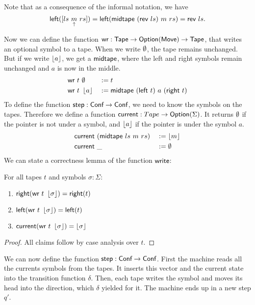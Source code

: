 Note that as a consequence of the informal notation, we have
$$\textsf{left}([ ls~\underset{\uparrow}{m}~rs ]) = \textsf{left}(\textsf{midtape}~(\textsf{rev}~ls)~{m}~{rs}) = \textsf{rev}~ls.$$

Now we can define the function $\textsf{wr} : \textsf{Tape} \rightarrow \textsf{Option}(\textsf{Move}) \rightarrow \textsf{Tape}$, that writes an optional symbol to a tape.  When we write $\emptyset$,
the tape remains unchanged.  But if we write $\left\lfloor {a}\right\rfloor$, we get a $\textsf{midtape}$, where the left and right symbols remain unchanged and $a$ is now in
the middle.
\begin{alignat*}{3}
  \textsf{wr}~t &~ \emptyset   &&:= t \\
  \textsf{wr}~t &~ \left\lfloor {a}\right\rfloor &&:= \textsf{midtape}~(\textsf{left}~t)~{a}~(\textsf{right}~t)
\end{alignat*}
To define the function $\textsf{step} : \textsf{Conf} \rightarrow \textsf{Conf}$, we need to know the symbols on the tapes.
Therefore we define a function $\textsf{current} : Tape \rightarrow \textsf{Option}(\Sigma)$.
It returns $\emptyset$ if the pointer is not under a symbol, and $\left\lfloor {a}\right\rfloor$ if the pointer is under the symbol $a$.
\begin{alignat*}{2}
  \textsf{current}&~(\textsf{midtape}~{ls}~{m}~{rs})&&:= \left\lfloor {m}\right\rfloor \\
  \textsf{current}&~\_                          &&:= \emptyset
\end{alignat*}
We can state a correctness lemma of the function $\textsf{write}$:
\begin{lemma}[Write]
  \label{lem:write}
  For all tapes $t$ and symbols $\sigma:\Sigma$:
  \begin{enumerate}
  \item $\textsf{right}   (\textsf{wr}~t~\left\lfloor {\sigma}\right\rfloor) = \textsf{right}(t)$
  \item $\textsf{left}    (\textsf{wr}~t~\left\lfloor {\sigma}\right\rfloor) = \textsf{left} (t)$
  \item $\textsf{current} (\textsf{wr}~t~\left\lfloor {\sigma}\right\rfloor) = \left\lfloor {\sigma}\right\rfloor$
  \end{enumerate}
\end{lemma}
\begin{proof}
  All claims follow by case analysis over $t$.
\end{proof}

We can now define the function $\textsf{step} : \textsf{Conf} \rightarrow \textsf{Conf}$.  First the machine reads all the currents symbols from the tapes.  It
inserts this vector and the current state into the transition function $\delta$.  Then, each tape writes the symbol and moves its head into the
direction, which $\delta$ yielded for it.  The machine ends up in a new step $q'$.

